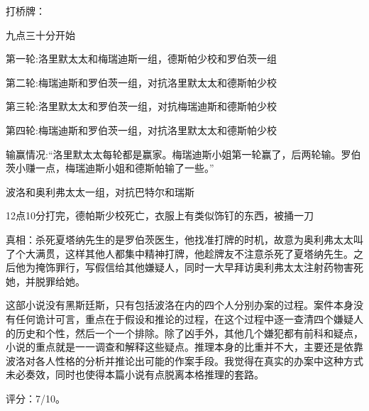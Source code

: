 打桥牌：
\begin{itemize*}
    \item 九点三十分开始
    \item 第一轮:洛里默太太和梅瑞迪斯一组，德斯帕少校和罗伯茨一组
    \item 第二轮:梅瑞迪斯和罗伯茨一组，对抗洛里默太太和德斯帕少校
    \item 第三轮:洛里默太太和罗伯茨一组，对抗梅瑞迪斯和德斯帕少校
    \item 第四轮:梅瑞迪斯和罗伯茨一组，对抗洛里默太太和德斯帕少校
    \item 输赢情况:“洛里默太太每轮都是赢家。梅瑞迪斯小姐第一轮赢了，后两轮输。罗伯茨小赚一点，梅瑞迪斯小姐和德斯帕输了一些。”
    \item 波洛和奥利弗太太一组，对抗巴特尔和瑞斯
    \item 12点10分打完，德帕斯少校死亡，衣服上有类似饰钉的东西，被捅一刀
\end{itemize*}

真相：杀死夏塔纳先生的是罗伯茨医生，他找准打牌的时机，故意为奥利弗太太叫了个大满贯，这样其他人都集中精神打牌，他趁牌友不注意杀死了夏塔纳先生。之后他为掩饰罪行，写假信给其他嫌疑人，同时一大早拜访奥利弗太太注射药物害死她，并脱罪给她。

这部小说没有黑斯廷斯，只有包括波洛在内的四个人分别办案的过程。案件本身没有任何诡计可言，重点在于假设和推论的过程，在这个过程中逐一查清四个嫌疑人的历史和个性，然后一个一个排除。除了凶手外，其他几个嫌犯都有前科和疑点，小说的重点就是一一调查和解释这些疑点。推理本身的比重并不大，主要还是依靠波洛对各人性格的分析并推论出可能的作案手段。我觉得在真实的办案中这种方式未必奏效，同时也使得本篇小说有点脱离本格推理的套路。

评分：7/10。